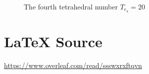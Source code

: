\documentclass{article}
\theoremstyle{definition}
\begin{document}
\vspace{1.75em}
\begin{figure}[H]
  \caption{The fourth tetrahedral number $T_{e_{4}} = 20$}
  \label{fig:tetrahedral_numbers}
\end{figure}
%
%
%
%
%
%
%
%
\vspace{0.75em}
\section*{\LaTeX \hspace{0.025 mm} Source}
\url{https://www.overleaf.com/read/ssswxrxftqvn}
%
%
%


%
%
%
%
%
\end{document}
